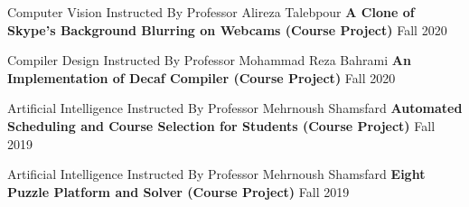 \begin{cventries}
    \cventry
    {Computer Vision Instructed By Professor Alireza Talebpour}
    {\textbf {A Clone of Skype's Background Blurring on Webcams (Course Project)}}
    {}
    {Fall 2020}
    {}
    \vspace{0.5 cm}

    \cventry
    {Compiler Design Instructed By Professor Mohammad Reza Bahrami}
    {\textbf {An Implementation of Decaf Compiler (Course Project)}}
    {}
    {Fall 2020}
    {}
    \vspace{0.5 cm}

    \cventry
    {Artificial Intelligence Instructed By Professor Mehrnoush Shamsfard}
    {\textbf {Automated Scheduling and Course Selection for Students (Course Project)}}
    {}
    {Fall 2019}
    {}
    \vspace{0.5 cm}

    \cventry
    {Artificial Intelligence Instructed By Professor Mehrnoush Shamsfard}
    {\textbf {Eight Puzzle Platform and Solver (Course Project)}}
    {}
    {Fall 2019}
    {}
    
\end{cventries}